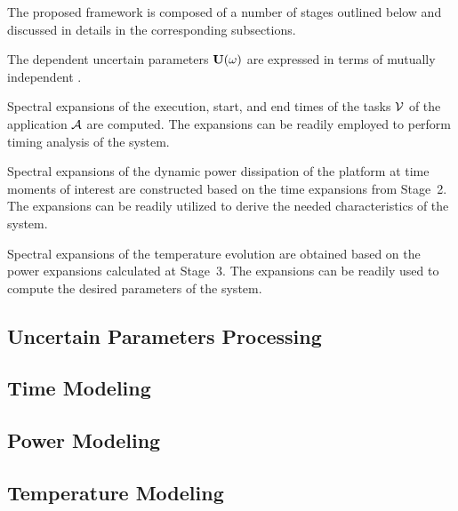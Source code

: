 The proposed framework is composed of a number of stages outlined below and discussed in details in the corresponding subsections.

 The dependent uncertain parameters $\mathbf{U}(\omega)$ are expressed in terms of mutually independent \rvs.

 Spectral expansions of the execution, start, and end times of the tasks $\mathcal{V}$ of the application $\mathcal{A}$ are computed. The expansions can be readily employed to perform timing analysis of the system.

 Spectral expansions of the dynamic power dissipation of the platform at time moments of interest are constructed based on the time expansions from Stage~2. The expansions can be readily utilized to derive the needed characteristics of the system.

 Spectral expansions of the temperature evolution are obtained based on the power expansions calculated at Stage~3. The expansions can be readily used to compute the desired parameters of the system.

\subsection{Uncertain Parameters Processing} 


\subsection{Time Modeling} 


\subsection{Power Modeling} 


\subsection{Temperature Modeling} 

